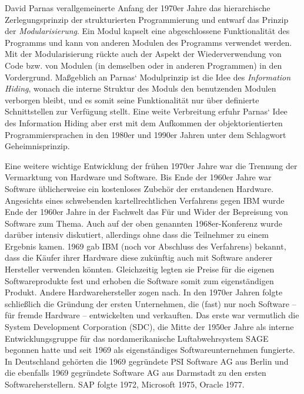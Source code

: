 David Parnas verallgemeinerte Anfang der 1970er Jahre das hierarchische Zer\-legungs\-prinzip der strukturierten Programmierung und entwarf das Prinzip der 
\textit{Modularisierung}. Ein Modul kapselt eine abgeschlossene Funktionalität des Programms und kann von anderen Modulen des Programms verwendet werden. Mit der Modularisierung rückte auch der Aspekt der Wiederverwendung von Code bzw. von Modulen (in demselben oder in anderen Programmen) in den Vordergrund. Maßgeblich an Parnas‘ Modulprinzip ist die Idee des \textit{Information Hiding}, wonach die interne Struktur des Moduls den benutzenden Modulen verborgen bleibt, und es somit seine Funktionalität nur über definierte Schnittstellen zur Verfügung stellt. Eine weite Verbreitung erfuhr Parnas‘ Idee des Information Hiding aber erst mit dem Aufkommen der 
\linebreak %
objektorientierten Programmiersprachen in den 1980er und 1990er Jahren unter dem Schlagwort Geheimnisprinzip. 


Eine weitere wichtige Entwicklung der frühen 1970er Jahre war die Trennung der Vermarktung von Hardware und Software.
Bis Ende der 1960er Jahre war Software üblicherweise ein kostenloses Zubehör der erstandenen Hardware. Angesichts eines schwebenden kartellrechtlichen Verfahrens gegen IBM wurde Ende der 1960er Jahre in der Fachwelt das Für und Wider der Bepreisung von Software zum Thema. Auch auf der oben genannten 1968er-Konferenz wurde darüber intensiv diskutiert, allerdings ohne dass die Teilnehmer zu einem Ergebnis kamen. 1969 gab IBM (noch vor Abschluss des Verfahrens) bekannt, dass die Käufer ihrer Hardware diese zukünftig auch mit Software anderer Hersteller verwenden könnten. Gleichzeitig legten sie Preise für die eigenen Softwareprodukte fest und erhoben die Software somit zum eigenständigen Produkt. Andere Hardwarehersteller zogen nach. In den 1970er Jahren folgte schließlich die Gründung der ersten Unternehmen, die (fast) nur noch Software – für fremde Hardware – entwickelten und verkauften. Das erste war vermutlich die System Development Corporation (SDC), die Mitte der 1950er Jahre als interne Entwicklungsgruppe für das nordamerikanische Luftabwehrsystem \mbox{SAGE} begonnen hatte und seit 1969 als eigenständiges Softwareunternehmen fungierte. In Deutschland gehörten die 1969 gegründete PSI Software AG aus Berlin und die ebenfalls 1969 gegründete Software AG aus Darmstadt zu den ersten Softwareherstellern. SAP folgte 1972, Microsoft 1975, Oracle 1977.

